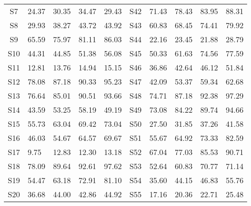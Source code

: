 \documentclass[10pt]{iopart}
\begin{document}
\begin{table*}[htbp]
\begin{center}
\begin{tabular}{ccccc|ccccc}
S7                                 & 24.37              & 30.35 & 34.47 & 29.43 & S42                                & 71.43 & 78.43 & 83.95 & 88.31 \\
S8                                 & 29.93              & 38.27 & 43.72 & 43.92 & S43                                & 60.83 & 68.45 & 74.41 & 79.92 \\
S9                                 & 65.59              & 75.97 & 81.11 & 86.03 & S44                                & 22.16 & 23.45 & 21.88 & 28.79 \\
S10                                & 44.31              & 44.85 & 51.38 & 56.08 & S45                                & 50.33 & 61.63 & 74.56 & 77.59 \\
S11                                & 12.81              & 13.76 & 14.94 & 15.15 & S46                                & 36.86 & 42.64 & 46.12 & 51.84 \\
S12                                & 78.08              & 87.18 & 90.33 & 95.23 & S47                                & 42.09 & 53.37 & 59.34 & 62.68 \\
S13                                & 76.64              & 85.01 & 90.51 & 93.66 & S48                                & 74.71 & 87.18 & 92.38 & 97.29 \\
S14                                & 43.59              & 53.25 & 58.19 & 49.19 & S49                                & 73.08 & 84.22 & 89.74 & 94.66 \\
S15                                & 55.73              & 63.04 & 69.42 & 73.04 & S50                                & 27.50 & 31.85 & 37.26 & 41.58 \\
S16                                & 46.03              & 54.67 & 64.57 & 69.67 & S51                                & 55.67 & 64.92 & 73.33 & 82.59 \\
S17                                & 9.75\              & 12.83 & 12.30 & 13.18 & S52                                & 67.04 & 77.03 & 85.53 & 90.71 \\
S18                                & 78.09              & 89.64 & 92.61 & 97.62 & S53                                & 52.64 & 60.83 & 70.77 & 71.14 \\
S19                                & 54.47              & 63.18 & 72.91 & 81.10 & S54                                & 35.60 & 44.15 & 46.83 & 55.76 \\
S20                                & 36.68              & 44.00 & 42.86 & 44.92 & S55                                & 17.16 & 20.36 & 22.71 & 25.48 \\

\end{tabular}
\end{center}
\end{table*}
\end{document}
